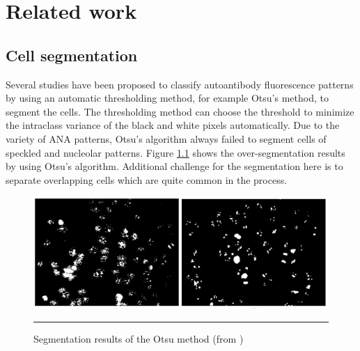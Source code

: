 
\chapter{Related work} 

\label{Chapter3} %



\section{Cell segmentation}

Several studies have been proposed to classify autoantibody fluorescence patterns by using an automatic thresholding method, for example  Otsu's method, to segment the cells. The  thresholding method can choose the threshold to minimize the intraclass variance of the black and white pixels automatically. Due to the variety of ANA patterns,  Otsu's algorithm always failed to segment cells of speckled and nucleolar patterns. Figure \ref{fig:BadSegment} shows the over-segmentation results by using Otsu's algorithm. Additional challenge for the segmentation here is to separate overlapping cells which are quite common in the process.

\begin{figure}[htbp]
	\centering
	\includegraphics[scale=0.4]{Figures/introduction/badsegmentation}
	\rule{35em}{0.5pt}
	\caption[Bad segmentation example]{Segmentation results of the Otsu method (from \cite{Huang2008})}
	\label{fig:BadSegment}

\end{figure}


